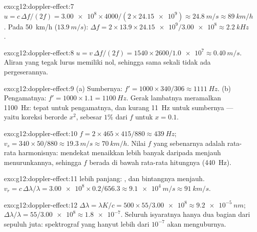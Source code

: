 \begin{solution}{exo:g12:doppler-effect:7}
$u = c\,\Delta f/(2f) = \num{3.00e8} \times 4000/(2 \times \num{24.15e9}) \approx
\qty{24.8}{m/s} \approx \qty{89}{km/h}$. Pada \qty{50}{km/h} ($\qty{13.9}{m/s}$):
$\Delta f = 2 \times 13.9 \times \num{24.15e9}/\num{3.00e8} \approx \qty{2.2}{kHz}$.
\end{solution}

\begin{solution}{exo:g12:doppler-effect:8}
$u = v\,\Delta f/(2f) = 1540 \times 2600/\num{1.0e7} \approx \qty{0.40}{m/s}$. Aliran yang
tegak lurus memiliki  nol, sehingga sama sekali tidak ada pergeserannya.
\end{solution}

\begin{solution}{exo:g12:doppler-effect:9}
(a) Sumbernya: $f' = 1000 \times 340/306 \approx \qty{1111}{Hz}$. (b) Pengamatnya:
$f' = 1000 \times 1.1 = \qty{1100}{Hz}$. Gerak lambatnya meramalkan \qty{1100}{Hz}: tepat
untuk pengamatnya, dan kurang \qty{11}{Hz} untuk sumbernya --- yaitu koreksi berorde $x^2$,
sebesar $1\%$ dari $f$ untuk $x = 0.1$.
\end{solution}

\begin{solution}{exo:g12:doppler-effect:10}
$f = 2 \times 465 \times 415/880 \approx \qty{439}{Hz}$;
$v_s = 340 \times 50/880 \approx \qty{19.3}{m/s} \approx \qty{70}{km/h}$. Nilai $f$ yang
sebenarnya adalah rata-rata harmonisnya: mendekat menaikkan  lebih banyak
daripada menjauh menurunkannya, sehingga $f$ berada di bawah rata-rata hitungnya
(\qty{440}{Hz}).
\end{solution}

\begin{solution}{exo:g12:doppler-effect:11}
 lebih panjang: , dan bintangnya menjauh.
$v_r = c\,\Delta\lambda/\lambda =
\num{3.00e8} \times 0.2/656.3 \approx \qty{9.1e4}{m/s} \approx \qty{91}{km/s}$.
\end{solution}

\begin{solution}{exo:g12:doppler-effect:12}
$\Delta\lambda = \lambda K/c = 500 \times 55/\num{3.00e8} \approx \qty{9.2e-5}{nm}$;
$\Delta\lambda/\lambda = 55/\num{3.00e8} \approx \num{1.8e-7}$. Seluruh isyaratnya hanya
dua bagian dari sepuluh juta: spektrograf yang hanyut lebih dari $10^{-7}$ akan
menguburnya.
\end{solution}

